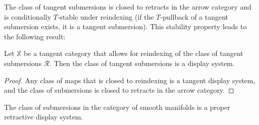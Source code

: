 The class of tangent submersions is closed to retracts in the arrow category and is conditionally $T$-stable under reindexing (if the $T$-pullback of a tangent submersion exists, it is a tangent submersion). This stability property leads to the following result:
\begin{proposition}\label{prop:display-submersions-are-r-display}
    Let $\mathbb{X}$ be a tangent category that allows for reindexing of the class of tangent submersions $\mathcal{R}$. Then the class of tangent submersions is a display system.
\end{proposition}
\begin{proof}
    Any class of maps that is closed to reindexing is a tangent display system, and the class of submersions is closed to retracts in the arrow category.
\end{proof}
\begin{corollary}\label{cor:sman-r-display}
    The class of submersions in the category of smooth manifolds is a  proper retractive display system.
\end{corollary}


